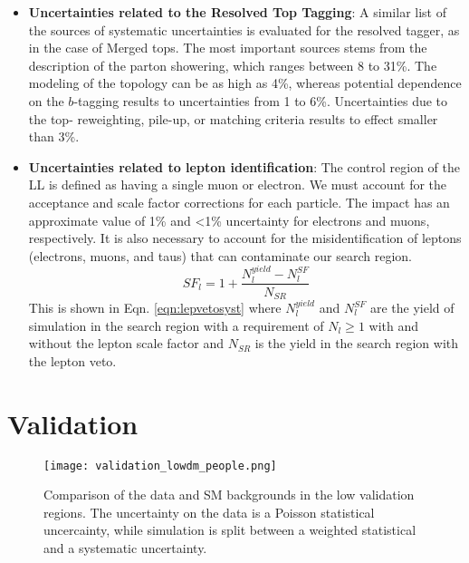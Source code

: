 \begin{itemize}
	\item \textbf{Uncertainties related to the Resolved Top Tagging}: A similar list of the sources of systematic uncertainties is evaluated for the resolved tagger, as in the case of Merged tops. The most important sources stems from the description of the parton showering, which ranges between 8 to 31\%. The modeling of the \ttbar{} topology can be as high as 4\%, whereas potential dependence on the $b$-tagging results to uncertainties from 1 to 6\%. Uncertainties due to the top-\pt{} reweighting, pile-up, or matching criteria results to effect smaller than 3\%. 
	\item \textbf{Uncertainties related to lepton identification}: The control region of the LL is defined as having a single muon or electron. We must account for the acceptance and scale factor corrections for each particle. The impact has an approximate value of 1\%  and <1\% uncertainty for electrons and muons, respectively. It is also necessary to account for the misidentification of leptons (electrons, muons, and taus) that can contaminate our search region. 
	\begin{equation}\label{eqn:lepvetosyst}
		SF_{l}=1+\frac{N_l^{yield}-N_l^{SF}}{N_{SR}}
	\end{equation}
	This is shown in Eqn. \ref{eqn:lepvetosyst} where $N_l^{yield}$ and $N_l^{SF}$ are  the yield of simulation in the search region with a requirement of $N_l\geq1$ with and without the lepton scale factor and $N_{SR}$ is the yield in the search region with the lepton veto.  
\end{itemize}

\section{Validation}\label{sec:Validation}



\begin{figure}
	\begin{center}
  \texttt{[image: validation\_lowdm\_people.png]}
	\end{center}
	\caption[LM Validation Region]{Comparison of the data and SM backgrounds in the low \dm{} validation regions. The uncertainty on the data is a Poisson statistical uncercainty, while simulation is split between a weighted statistical and a systematic uncertainty.
	 }
	\label{fig:validation-region-lm}
\end{figure}

